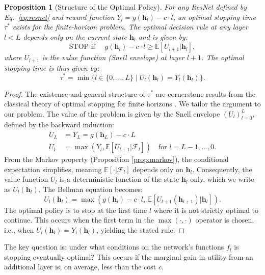 \documentclass[12pt]{imsart}
\newcommand{\E}{\mathbb{E}}
\newcommand{\F}{\mathcal{F}}
\newcommand{\h}{\mathbf{h}}
\theoremstyle{plain}
\newtheorem{proposition}[theorem]{Proposition}
\theoremstyle{definition}
\begin{document}
\begin{proposition}[Structure of the Optimal Policy] \label{prop:structure}
For any ResNet defined by Eq.~\eqref{eq:resnet} and reward function $Y_l = g(\h_l) - c \cdot l$, an optimal stopping time $\tau^*$ exists for the finite-horizon problem. The optimal decision rule at any layer $l < L$ depends only on the current state $\h_l$ and is given by:
\begin{equation} \label{eq:optimal_rule}
\text{STOP if } \quad g(\h_l) - c \cdot l \ge \E[U_{l+1} | \h_l],
\end{equation}
where $U_{l+1}$ is the value function (Snell envelope) at layer $l+1$. The optimal stopping time is thus given by:
\begin{equation}
\tau^* = \min \{ l \in \{0, \dots, L\} \mid U_l(\h_l) = Y_l(\h_l) \}.
\end{equation}
\end{proposition}
\begin{proof}
The existence and general structure of $\tau^*$ are cornerstone results from the classical theory of optimal stopping for finite horizons \cite{Peskir2006}. We tailor the argument to our problem. The value of the problem is given by the Snell envelope $(U_l)_{l=0}^L$, defined by the backward induction:
\begin{align*}
U_L &= Y_L = g(\h_L) - c \cdot L \\
U_l &= \max(Y_l, \E[U_{l+1} | \F_l]) \quad \text{for } l = L-1, \dots, 0.
\end{align*}
From the Markov property (Proposition \ref{prop:markov}), the conditional expectation simplifies, meaning $\E[\cdot | \F_l]$ depends only on $\h_l$.
Consequently, the value function $U_l$ is a deterministic function of the state $\h_l$ only, which we write as $U_l(\h_l)$. The Bellman equation becomes:
\[ U_l(\h_l) = \max\left( g(\h_l) - c \cdot l, \, \E[U_{l+1}(\h_{l+1}) | \h_l] \right). \]
The optimal policy is to stop at the first time $l$ where it is not strictly optimal to continue. This occurs when the first term in the $\max(\cdot, \cdot)$ operator is chosen, i.e., when $U_l(\h_l) = Y_l(\h_l)$, yielding the stated rule.
\end{proof}

The key question is: under what conditions on the network's functions $f_l$ is stopping eventually optimal? This occurs if the marginal gain in utility from an additional layer is, on average, less than the cost $c$.
\end{document}
